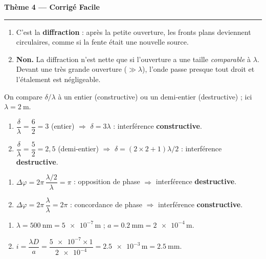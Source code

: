 \documentclass[11pt,a4paper]{article}
\begin{document}
\begin{center}
{\large\bfseries\color{excol} Thème 4 — Corrigé Facile}\\[-2pt]
{\color{excol}\rule{5cm}{1pt}}
\end{center}

\begin{corrige}
\begin{enumerate}[label=\alph*)]
  \item C'est la \textbf{diffraction} : après la petite ouverture, les fronts plans deviennent
        circulaires, comme si la fente était une nouvelle source.
  \item \textbf{Non.} La diffraction n'est nette que si l'ouverture a une taille \emph{comparable}
        à $\lambda$. Devant une très grande ouverture ($\gg\lambda$), l'onde passe presque tout
        droit et l'étalement est négligeable.
\end{enumerate}
\end{corrige}

\begin{corrige}
On compare $\delta/\lambda$ à un entier (constructive) ou un demi-entier (destructive) ;
ici $\lambda=\SI{2}{\metre}$.
\begin{enumerate}[label=\alph*)]
  \item $\dfrac{\delta}{\lambda}=\dfrac{6}{2}=3$ (entier) $\Rightarrow$ $\delta=3\lambda$ :
        interférence \textbf{constructive}.
  \item $\dfrac{\delta}{\lambda}=\dfrac{5}{2}=2{,}5$ (demi-entier) $\Rightarrow$
        $\delta=(2\times2+1)\lambda/2$ : interférence \textbf{destructive}.
\end{enumerate}
\end{corrige}

\begin{corrige}
\begin{enumerate}[label=\alph*)]
  \item $\Delta\varphi=2\pi\,\dfrac{\lambda/2}{\lambda}=\pi$ : opposition de phase
        $\Rightarrow$ interférence \textbf{destructive}.
  \item $\Delta\varphi=2\pi\,\dfrac{\lambda}{\lambda}=2\pi$ : concordance de phase
        $\Rightarrow$ interférence \textbf{constructive}.
\end{enumerate}
\end{corrige}

\begin{corrige}
\begin{enumerate}[label=\alph*)]
  \item $\lambda=\SI{500}{\nano\metre}=\num{5e-7}\,\si{\metre}$ ;
        $a=\SI{0.2}{\milli\metre}=\num{2e-4}\,\si{\metre}$.
  \item $i=\dfrac{\lambda D}{a}=\dfrac{\num{5e-7}\times 1}{\num{2e-4}}
        =\num{2.5e-3}\,\si{\metre}=\SI{2.5}{\milli\metre}.$
\end{enumerate}
\end{corrige}
\end{document}
